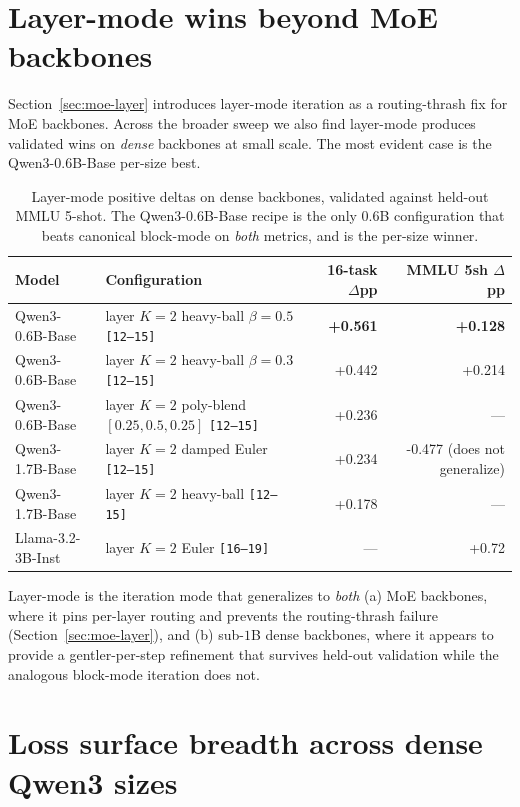 \section{Layer-mode wins beyond MoE backbones}
\label{app:layer-mode-dense}

Section~\ref{sec:moe-layer} introduces layer-mode iteration as a routing-thrash fix for MoE backbones. Across the broader sweep we also find layer-mode produces validated wins on \emph{dense} backbones at small scale. The most evident case is the Qwen3-0.6B-Base per-size best.

\begin{table}[h]
\centering
\footnotesize
\caption{Layer-mode positive deltas on dense backbones, validated against held-out MMLU 5-shot. The Qwen3-0.6B-Base recipe is the only 0.6B configuration that beats canonical block-mode on \emph{both} metrics, and is the per-size winner.}
\label{tab:layer-mode-dense}
\setlength{\tabcolsep}{6pt}
\begin{tabular}{llrr}
\toprule
Model & Configuration & 16-task $\Delta$pp & MMLU 5sh $\Delta$pp \\
\midrule
Qwen3-0.6B-Base
   & layer $K{=}2$ heavy-ball $\beta{=}0.5$ \texttt{[12--15]}
   & \textbf{+0.561} & \textbf{+0.128} \\
Qwen3-0.6B-Base
   & layer $K{=}2$ heavy-ball $\beta{=}0.3$ \texttt{[12--15]}
   & +0.442 & +0.214 \\
Qwen3-0.6B-Base
   & layer $K{=}2$ poly-blend $[0.25,0.5,0.25]$ \texttt{[12--15]}
   & +0.236 & ---       \\
Qwen3-1.7B-Base
   & layer $K{=}2$ damped Euler \texttt{[12--15]}
   & +0.234 & -0.477 (does not generalize) \\
Qwen3-1.7B-Base
   & layer $K{=}2$ heavy-ball \texttt{[12--15]}
   & +0.178 & ---       \\
Llama-3.2-3B-Inst
   & layer $K{=}2$ Euler \texttt{[16--19]}
   & ---       & +0.72 \\
\bottomrule
\end{tabular}
\end{table}

Layer-mode is the iteration mode that generalizes to \emph{both} (a) MoE backbones, where it pins per-layer routing and prevents the routing-thrash failure (Section~\ref{sec:moe-layer}), and (b) sub-$1$B dense backbones, where it appears to provide a gentler-per-step refinement that survives held-out validation while the analogous block-mode iteration does not.

\section{Loss surface breadth across dense Qwen3 sizes}
\label{app:position-landscape}

